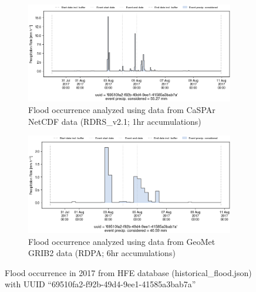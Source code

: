 \documentclass[10pt,a4paper,titlepage,parskip]{scrartcl}
\begin{document}
\begin{figure}[h]
	\begin{subfigure}[a]{1.0\textwidth}
		\centering
		\includegraphics[width=\linewidth]{figures/compare_Geomet_CaSPAr/interpolated_at_stations_occurrence_936_identified-timesteps_RDRS_v2.1.png}
		\caption{Flood occurrence analyzed using data from CaSPAr NetCDF data (RDRS\_v2.1; 1hr accumulations)}
	\end{subfigure}
	\par\bigskip\bigskip
	\begin{subfigure}[b]{1.0\textwidth}
		\centering
		\includegraphics[width=\linewidth]{figures/compare_Geomet_CaSPAr/interpolated_at_stations_occurrence_936_identified-timesteps_rdpa_10km_6f.png}
		\caption{Flood occurrence analyzed using data from GeoMet GRIB2 data (RDPA; 6hr accumulations)}
	\end{subfigure}
	\par\bigskip\bigskip
	\caption{Flood occurrence in 2017 from HFE database (historical\_flood.json) with UUID ``69510fa2-f92b-49d4-9ee1-41585a3bab7a''}
\end{figure}
\pagebreak
\end{document}
